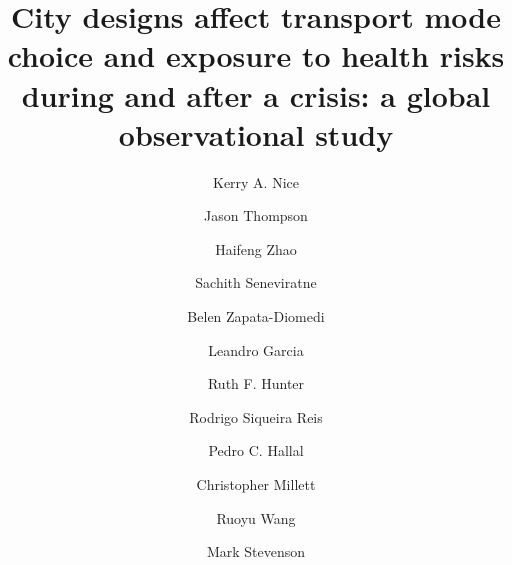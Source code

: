 \documentclass[preprint,10pt]{elsarticle} %
\begin{document}
\begin{frontmatter}

\title{City designs affect transport mode choice and exposure to health risks during and after a crisis: a global observational study}

\author[melb]{Kerry A. Nice}
\author[melb,sun]{Jason Thompson}
\author[melb]{Haifeng Zhao}
\author[melb]{Sachith Seneviratne}
\author[RMII]{Belen Zapata-Diomedi}
\author[Belfast,phy]{Leandro Garcia}
\author[Belfast]{Ruth F. Hunter}
\author[wash]{Rodrigo Siqueira Reis}
\author[uill,PPE]{Pedro C. Hallal}
\author[imp,nova,ieps]{Christopher Millett}
\author[Belfast]{Ruoyu Wang}
\author[melb,eng]{Mark Stevenson}

\address[melb]{Transport, Health, and Urban Systems Research Lab, Faculty of Architecture, Building, and Planning, University of Melbourne, VIC, Australia}
\address[eng]{Faculty of Engineering and Information Technology and the Melbourne School of Population and Global Health, University of Melbourne, VIC, Australia}
\address[sun]{Centre for Human Factors and Sociotechnical Systems University of the Sunshine Coast, Queensland, Australia}
\address[RMII]{Healthy Liveable Cities Lab, Centre for Urban Research, RMIT University, Melbourne, Australia}
\address[Belfast]{Centre for Public Health, Queen’s University Belfast, Institute of Clinical Sciences B, Belfast, Northern Ireland, UK}
\address[wash]{Washington University, St. Louis, Missouri, US}
\address[uill]{Department of Kinesiology and Community Health, University of Illinois Urbana-Champaign}
\address[imp]{Public Health Policy Evaluation Unit, School of Public Health, Imperial College London, London, United Kingdom}
\address[nova]{NOVA National School of Public Health, Public Health Research Centre, Comprehensive Health Research Center (CHRC), NOVA University Lisbon, Lisbon, Portugal}
\address[ieps]{Instituto de Estudos para Políticas de Saúde (IEPS), São Paulo, Brazil}
\address[PPE]{Postgraduate Program in Epidemiology, Federal University of Pelotas, Brazil}
\address[phy]{Physical Activity Epidemiology Group, University of São Paulo, São Paulo, Brazil}



\end{frontmatter}
\end{document}
